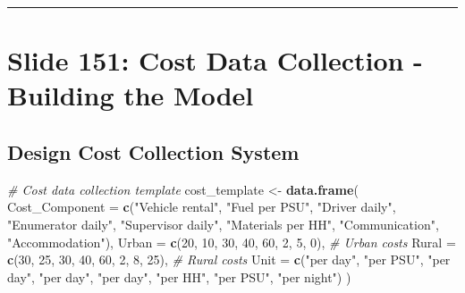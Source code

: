 \documentclass[
]{article}
\newenvironment{Shaded}{\begin{snugshade}}{\end{snugshade}}
\newcommand{\AttributeTok}[1]{\textcolor[rgb]{0.13,0.29,0.53}{#1}}
\newcommand{\CommentTok}[1]{\textcolor[rgb]{0.56,0.35,0.01}{\textit{#1}}}
\newcommand{\DecValTok}[1]{\textcolor[rgb]{0.00,0.00,0.81}{#1}}
\newcommand{\FunctionTok}[1]{\textcolor[rgb]{0.13,0.29,0.53}{\textbf{#1}}}
\newcommand{\NormalTok}[1]{#1}
\newcommand{\OtherTok}[1]{\textcolor[rgb]{0.56,0.35,0.01}{#1}}
\newcommand{\StringTok}[1]{\textcolor[rgb]{0.31,0.60,0.02}{#1}}
\begin{document}
\begin{center}\rule{0.5\linewidth}{0.5pt}\end{center}

\section{Slide 151: Cost Data Collection - Building the
Model}\label{slide-151-cost-data-collection---building-the-model}

\subsection{Design Cost Collection
System}\label{design-cost-collection-system}

\begin{Shaded}
\begin{Highlighting}[]
\CommentTok{\# Cost data collection template}
\NormalTok{cost\_template }\OtherTok{\textless{}{-}} \FunctionTok{data.frame}\NormalTok{(}
  \AttributeTok{Cost\_Component =} \FunctionTok{c}\NormalTok{(}\StringTok{"Vehicle rental"}\NormalTok{, }\StringTok{"Fuel per PSU"}\NormalTok{, }\StringTok{"Driver daily"}\NormalTok{,}
                     \StringTok{"Enumerator daily"}\NormalTok{, }\StringTok{"Supervisor daily"}\NormalTok{, }
                     \StringTok{"Materials per HH"}\NormalTok{, }\StringTok{"Communication"}\NormalTok{, }\StringTok{"Accommodation"}\NormalTok{),}
  \AttributeTok{Urban =} \FunctionTok{c}\NormalTok{(}\DecValTok{20}\NormalTok{, }\DecValTok{10}\NormalTok{, }\DecValTok{30}\NormalTok{, }\DecValTok{40}\NormalTok{, }\DecValTok{60}\NormalTok{, }\DecValTok{2}\NormalTok{, }\DecValTok{5}\NormalTok{, }\DecValTok{0}\NormalTok{),    }\CommentTok{\# Urban costs}
  \AttributeTok{Rural =} \FunctionTok{c}\NormalTok{(}\DecValTok{30}\NormalTok{, }\DecValTok{25}\NormalTok{, }\DecValTok{30}\NormalTok{, }\DecValTok{40}\NormalTok{, }\DecValTok{60}\NormalTok{, }\DecValTok{2}\NormalTok{, }\DecValTok{8}\NormalTok{, }\DecValTok{25}\NormalTok{),    }\CommentTok{\# Rural costs}
  \AttributeTok{Unit =} \FunctionTok{c}\NormalTok{(}\StringTok{"per day"}\NormalTok{, }\StringTok{"per PSU"}\NormalTok{, }\StringTok{"per day"}\NormalTok{, }\StringTok{"per day"}\NormalTok{, }\StringTok{"per day"}\NormalTok{,}
           \StringTok{"per HH"}\NormalTok{, }\StringTok{"per PSU"}\NormalTok{, }\StringTok{"per night"}\NormalTok{)}
\NormalTok{)}


\end{Highlighting}
\end{Shaded}
\end{document}
